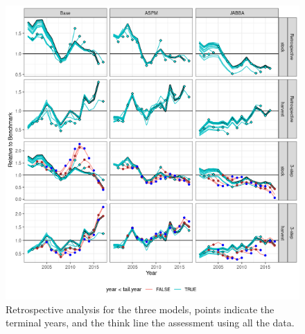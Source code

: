 \documentclass[12pt,halfline,a4paper,nonumbib]{ouparticle}
\begin{document}
\begin{figure}[htbp]
\centering
\includegraphics[width=6in]{final-retro-all-1.png}
\caption{Retrospective analysis for the three models, points indicate the terminal years, and the think line the assessment using all the data.}
\label{fig:retro}
\end{figure}
\end{document}

